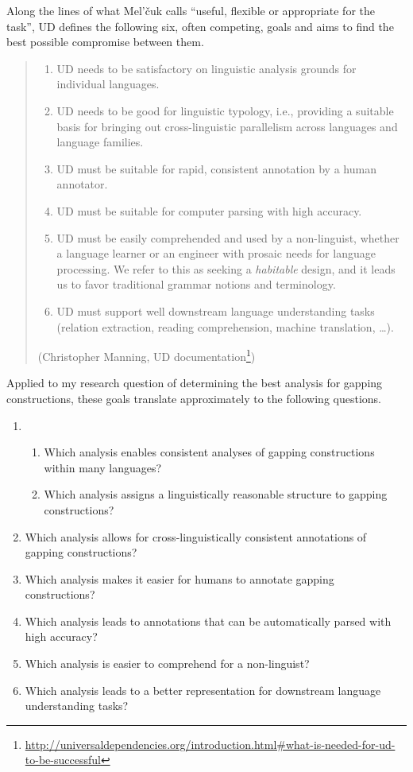 \documentclass[lucida,biblatex]{sp} %
\begin{document}
Along the lines of what Mel'\v{c}uk calls ``useful, flexible or appropriate for the task'',  UD defines the following six, often competing, goals and aims to find the best possible compromise between them. 

\begin{quote}
\begin{enumerate}[label={\arabic*.}]
\item UD needs to be satisfactory on linguistic analysis grounds for individual languages.
\item UD needs to be good for linguistic typology, i.e., providing a suitable basis for bringing out cross-linguistic parallelism across languages and language families.
\item UD must be suitable for rapid, consistent annotation by a human annotator.
\item UD must be suitable for computer parsing with high accuracy.
\item UD must be easily comprehended and used by a non-linguist, whether a language learner or an engineer with prosaic needs for language processing. We refer to this as seeking a {\it habitable} design, and it leads us to favor traditional grammar notions and terminology.
\item UD must support well downstream language understanding tasks (relation extraction, reading comprehension, machine translation, …).
\end{enumerate}
\null \hfill (Christopher Manning, UD documentation\footnote{\url{http://universaldependencies.org/introduction.html\#what-is-needed-for-ud-to-be-successful}})
\end{quote}

Applied to my research question of determining the best analysis for gapping constructions, these goals translate approximately to the following questions.

\begin{enumerate}[label={\arabic*.}]
\item \begin{enumerate} 
\item Which analysis enables consistent analyses of gapping constructions within many languages?
\item Which analysis assigns a linguistically reasonable structure to gapping constructions?
\end{enumerate}
\item Which analysis allows for cross-linguistically consistent annotations of gapping constructions?
\item Which analysis makes it easier for humans to annotate gapping constructions?
\item Which analysis leads to annotations that can be automatically parsed with high accuracy?
\item Which analysis is easier to comprehend for a non-linguist?
\item Which analysis leads to a better representation for downstream language understanding tasks?
\end{enumerate}
\end{document}
